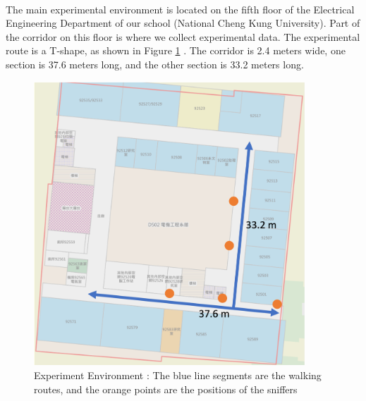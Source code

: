 \documentclass[a4paper,12pt]{report}
\begin{document}
\paragraph{}
The main experimental environment is located on the fifth floor of the Electrical Engineering Department of our school (National Cheng Kung University). Part of the corridor on this floor is where we collect experimental data. The experimental route is a T-shape, as shown in Figure \ref{f:Experimental_Setup_Map} . The corridor is 2.4 meters wide, one section is 37.6 meters long, and the other section is 33.2 meters long.
\begin{figure}[btph]
\begin{center}
\includegraphics[width=4in,height=4.2in]{images and data/Experimental_Setup_Map_Yun.png}
\caption{Experiment Environment : The blue line segments are the walking routes, and the orange points are the positions of the sniffers}
\label{f:Experimental_Setup_Map}
\end{center}
\end{figure}
\end{document}
